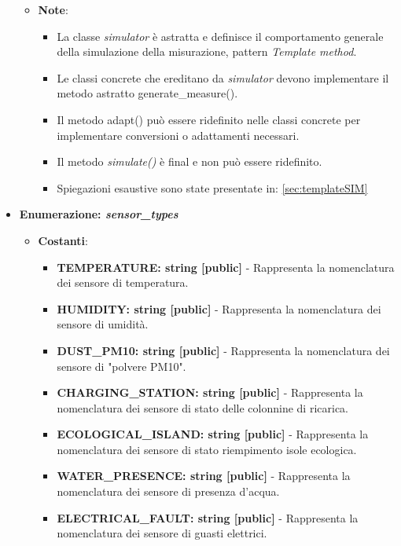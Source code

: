 \begin{itemize}
\begin{itemize}
\begin{itemize}
        \end{itemize}
        \item \textbf{Note}:
        \begin{itemize}
            \item La classe \textit{simulator} è astratta e definisce il comportamento generale della simulazione della misurazione, pattern \textit{Template method}.
            \item Le classi concrete che ereditano da \textit{simulator} devono implementare il metodo astratto generate\_measure().
            \item Il metodo adapt() può essere ridefinito nelle classi concrete per implementare conversioni o adattamenti necessari.
            \item Il metodo \textit{simulate()} è final e non può essere ridefinito.
            \item Spiegazioni esaustive sono state presentate in: \ref{sec:templateSIM}
        \end{itemize}
    \end{itemize}
        
    \item{\textbf{Enumerazione: \textit{sensor\_types}}}
    \begin{itemize}
        \item \textbf{Costanti}: 
        \begin{itemize}
            \item \textbf{TEMPERATURE: string [public]} - Rappresenta la nomenclatura dei sensore di temperatura.
            \item \textbf{HUMIDITY: string [public]} - Rappresenta la nomenclatura dei sensore di umidità.
            \item \textbf{DUST\_PM10: string [public]} - Rappresenta la nomenclatura dei sensore di "polvere PM10".
            \item \textbf{CHARGING\_STATION: string [public]} - Rappresenta la nomenclatura dei sensore di stato delle colonnine di ricarica.
            \item \textbf{ECOLOGICAL\_ISLAND: string [public]} - Rappresenta la nomenclatura dei sensore di stato riempimento isole ecologica.
            \item \textbf{WATER\_PRESENCE: string [public]} - Rappresenta la nomenclatura dei sensore di presenza d'acqua.
            \item \textbf{ELECTRICAL\_FAULT: string [public]} - Rappresenta la nomenclatura dei sensore di guasti elettrici.
        \end{itemize}


\end{itemize}
\end{itemize}
